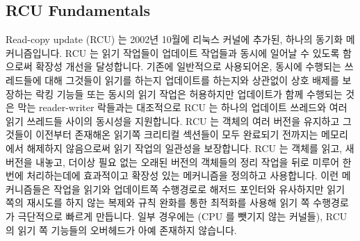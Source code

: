 
\subsection{RCU Fundamentals}
\label{sec:defer:RCU Fundamentals}

Read-copy update (RCU) 는 2002년 10월에 리눅스 커널에 추가된, 하나의 동기화
메커니즘입니다.
RCU 는 읽기 작업들이 업데이트 작업들과 동시에 일어날 수 있도록 함으로써 확장성
개선을 달성합니다.
기존에 일반적으로 사용되어온, 동시에 수행되는 쓰레드들에 대해 그것들이 읽기를
하는지 업데이트를 하는지와 상관없이 상호 배제를 보장하는 락킹 기능들 또는
동시의 읽기 작업은 허용하지만 업데이트가 함께 수행되는 것은 막는 reader-writer
락들과는 대조적으로 RCU 는 하나의 업데이트 쓰레드와 여러 읽기 쓰레드들 사이의
동시성을 지원합니다.
RCU 는 객체의 여러 버전을 유지하고 그것들이 이전부터 존재해온 읽기쪽 크리티컬
섹션들이 모두 완료되기 전까지는 메모리에서 해제하지 않음으로써 읽기 작업의
일관성을 보장합니다.
RCU 는 객체를 읽고, 새 버전을 내놓고, 더이상 필요 없는 오래된 버전의 객체들의
정리 작업을 뒤로 미루어 한번에 처리하는데에 효과적이고 확장성 있는 메커니즘을
정의하고 사용합니다.
이런 메커니즘들은 작업을 읽기와 업데이트쪽 수행경로로 해저드 포인터와
유사하지만 읽기 쪽의 재시도를 하지 않는 복제와 규칙 완화를 통한 최적화를 사용해
읽기 쪽 수행경로가 극단적으로 빠르게 만듭니다.
일부 경우에는 (CPU 를 뺏기지 않는 커널들), RCU 의 읽기 쪽 기능들의 오버헤드가
아예 존재하지 않습니다.

